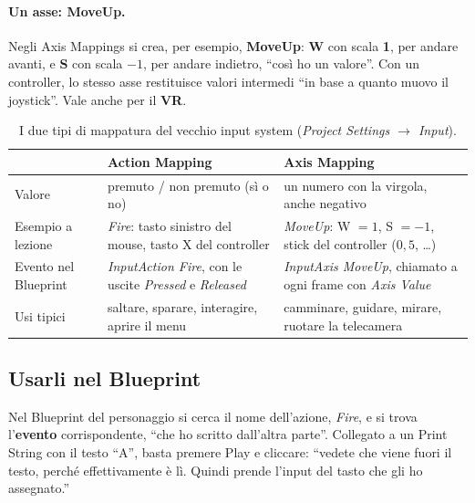 \paragraph{Un asse: MoveUp.} Negli Axis Mappings si crea, per esempio,
\textbf{MoveUp}: \textbf{W} con scala \textbf{1}, per andare avanti, e
\textbf{S} con scala \textbf{$-1$}, per andare indietro, ``così ho un valore''.
Con un controller, lo stesso asse restituisce valori intermedi ``in base a quanto
muovo il joystick''. Vale anche per il \textbf{VR}.

\begin{table}[htbp]
\centering
\small
\begin{tabular}{p{2.6cm}p{5cm}p{5.4cm}}
\toprule
 & \textbf{Action Mapping} & \textbf{Axis Mapping}\\
\midrule
Valore & premuto / non premuto (sì o no) & un numero con la virgola, anche
negativo\\
Esempio a lezione & \emph{Fire}: tasto sinistro del mouse, tasto X del
controller & \emph{MoveUp}: W $= 1$, S $= -1$, stick del controller
($0{,}5$, \dots)\\
Evento nel Blueprint & \emph{InputAction Fire}, con le uscite
\emph{Pressed} e \emph{Released} & \emph{InputAxis MoveUp}, chiamato a ogni
frame con \emph{Axis Value}\\
Usi tipici & saltare, sparare, interagire, aprire il menu & camminare, guidare,
mirare, ruotare la telecamera\\
\bottomrule
\end{tabular}
\caption{I due tipi di mappatura del vecchio input system (\emph{Project
Settings $\rightarrow$ Input}).}
\label{gd13:tab:input}
\end{table}

\subsection{Usarli nel Blueprint}

Nel Blueprint del personaggio si cerca il nome dell'azione, \emph{Fire}, e si
trova l'\textbf{evento} corrispondente, ``che ho scritto dall'altra parte''.
Collegato a un Print String con il testo ``A'', basta premere Play e cliccare:
``vedete che viene fuori il testo, perché effettivamente è lì. Quindi prende
l'input del tasto che gli ho assegnato.''

